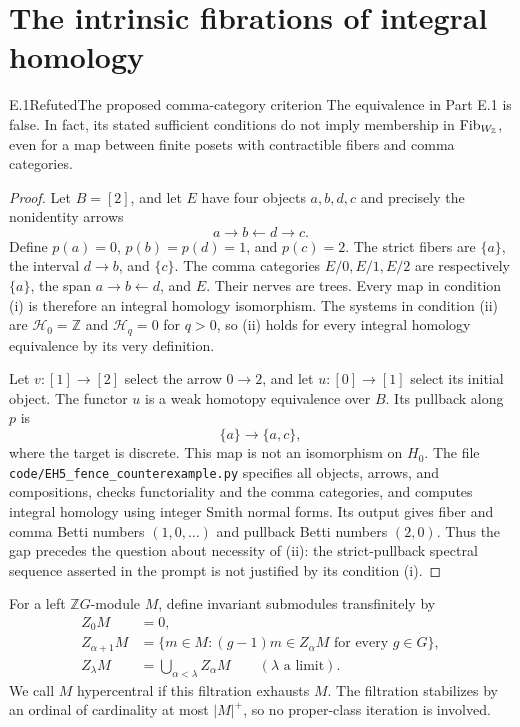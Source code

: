 \section{The intrinsic fibrations of integral homology}

\begin{claim}{E.1}{Refuted}{The proposed comma-category criterion}
The equivalence in Part E.1 is false. In fact, its stated sufficient
conditions do not imply membership in $\operatorname{Fib}_{W_{\mathbb Z}}$, even for a map
between finite posets with contractible fibers and comma categories.
\end{claim}
\begin{proof}
Let $B=[2]$, and let $E$ have four objects $a,b,d,c$ and precisely
the nonidentity arrows
\[
                         a\longrightarrow b\longleftarrow d
                           \longrightarrow c.
\]
Define $p(a)=0$, $p(b)=p(d)=1$, and $p(c)=2$. The strict fibers are
$\{a\}$, the interval $d\to b$, and $\{c\}$. The comma categories
$E/0,E/1,E/2$ are respectively $\{a\}$, the span $a\to b\leftarrow d$,
and $E$. Their nerves are trees. Every map in condition (i) is therefore
an integral homology isomorphism. The systems in condition (ii) are
$\mathcal H_0=\mathbb Z$ and $\mathcal H_q=0$ for $q>0$, so (ii)
holds for every integral homology equivalence by its very definition.

Let $v:[1]\to[2]$ select the arrow $0\to2$, and let
$u:[0]\to[1]$ select its initial object. The functor $u$ is a weak
homotopy equivalence over $B$. Its pullback along $p$ is
\[
                          \{a\}\longrightarrow\{a,c\},
\]
where the target is discrete. This map is not an isomorphism on $H_0$.
The file \texttt{code/EH5\_fence\_counterexample.py} specifies all objects,
arrows, and compositions, checks functoriality and the comma categories,
and computes integral homology using integer Smith normal forms.
Its output gives fiber and comma Betti numbers $(1,0,\ldots)$ and
pullback Betti numbers $(2,0)$. Thus the gap precedes the question
about necessity of (ii): the strict-pullback spectral sequence asserted
in the prompt is not justified by its condition (i).
\end{proof}

\begin{definition}
For a left $\mathbb ZG$-module $M$, define invariant submodules
transfinitely by
\[
 \begin{split}
 Z_0M&=0,\\
 Z_{\alpha+1}M&=\{m\in M:(g-1)m\in Z_\alpha M
                                      \text{ for every }g\in G\},\\
 Z_\lambda M&=\bigcup_{\alpha<\lambda}Z_\alpha M
                                      \qquad(\lambda\text{ a limit}).
 \end{split}
\]
We call $M$ hypercentral if this filtration exhausts $M$.
The filtration stabilizes by an ordinal of cardinality at most
$|M|^+$, so no proper-class iteration is involved.
\end{definition}

